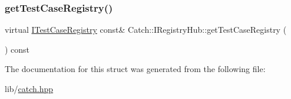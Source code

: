 \subsubsection{\texorpdfstring{get\+Test\+Case\+Registry()}{getTestCaseRegistry()}}
{\footnotesize\ttfamily virtual \hyperlink{struct_catch_1_1_i_test_case_registry}{I\+Test\+Case\+Registry} const\& Catch\+::\+I\+Registry\+Hub\+::get\+Test\+Case\+Registry (\begin{DoxyParamCaption}{ }\end{DoxyParamCaption}) const\hspace{0.3cm}{\ttfamily [pure virtual]}}



The documentation for this struct was generated from the following file\+:\begin{DoxyCompactItemize}
\item 
lib/\hyperlink{catch_8hpp}{catch.\+hpp}\end{DoxyCompactItemize}
